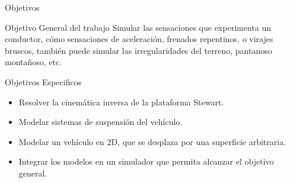 \documentclass{beamer}
\begin{document}
\begin{frame}{Objetivos}
\begin{block}{Objetivo General del trabajo} Simular las sensaciones que experimenta un conductor, cómo sensaciones de aceleración, frenados repentinos, o virajes bruscos, también puede simular las irregularidades del terreno, pantanoso montañoso, etc.
\end{block}
\begin{block}{Objetivos Especificos}
\begin{itemize}
 \item Resolver la cinemática inversa de la plataforma Stewart.
 \item Modelar sistemas de suspensión del vehículo.
 \item Modelar un vehículo en 2D, que se desplaza por una superficie arbitraria.
 \item Integrar los modelos en un simulador que permita alcanzar el objetivo general.
\end{itemize}
\end{block}

\end{frame}
\end{document}
